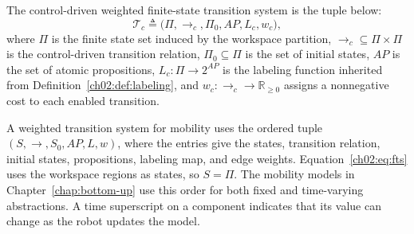 \begin{definition}
\label{ch02:def:FTS}
The control-driven weighted finite-state transition system is the tuple below:
\begin{equation}
\mathcal{T}_c \triangleq
\bigl(\Pi,\longrightarrow_c,\Pi_0,AP,L_c,w_c\bigr),
\label{ch02:eq:fts}
\end{equation}
where $\Pi$ is the finite state set induced by the workspace partition,
$\longrightarrow_c \subseteq \Pi \times \Pi$ is the control-driven transition
relation,
$\Pi_0 \subseteq \Pi$ is the set of initial states,
$AP$ is the set of atomic propositions,
$L_c : \Pi \to 2^{AP}$ is the labeling function inherited from
Definition~\ref{ch02:def:labeling}, and
$w_c : \longrightarrow_c \to \mathbb{R}_{\geq 0}$ assigns a nonnegative cost to
each enabled transition.
\end{definition}

\begin{revision}
A weighted transition system for mobility uses the ordered tuple
$(S,\longrightarrow,S_0,AP,L,w)$, where the entries give the states,
transition relation, initial states, propositions, labeling map, and edge weights.
Equation~\eqref{ch02:eq:fts} uses the workspace regions as states, so $S=\Pi$.
The mobility models in Chapter~\ref{chap:bottom-up} use this order for both
fixed and time-varying abstractions. A time superscript on a component
indicates that its value can change as the robot updates the model.
\end{revision}


